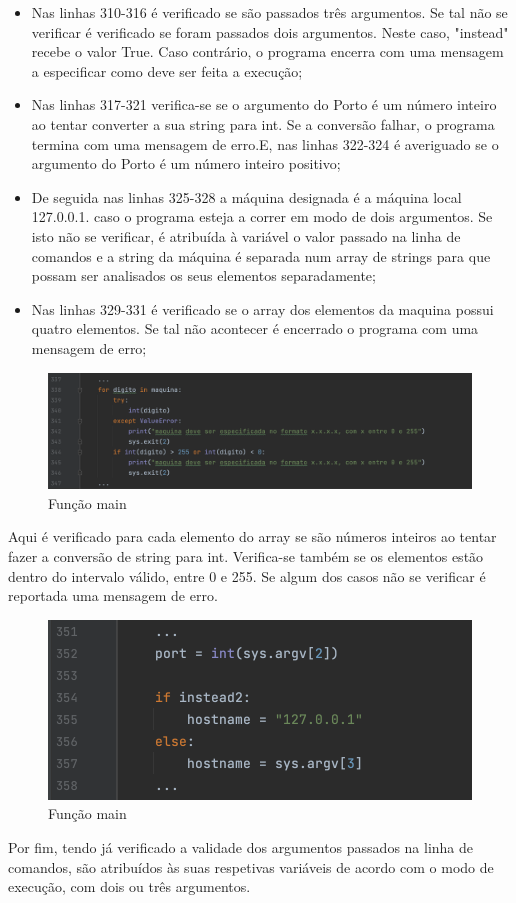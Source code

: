 \documentclass{report}
\begin{document}
\begin{itemize}
\item Nas linhas 310-316 é verificado se são passados três argumentos. Se tal não se verificar é verificado se foram passados dois argumentos. Neste caso, "instead" recebe o valor True. Caso contrário, o programa encerra com uma mensagem a especificar como deve ser feita a execução;
\item Nas linhas 317-321 verifica-se se o argumento do Porto é um número inteiro ao tentar converter a sua string para int. Se a conversão falhar, o programa termina com uma mensagem de erro.E, nas linhas 322-324 é averiguado se o argumento do Porto é um número inteiro positivo;
\item De seguida nas linhas 325-328 a máquina designada é a máquina local 127.0.0.1. caso o programa esteja a correr em modo de dois argumentos. Se isto não se verificar, é atribuída à variável o valor passado na linha de comandos e a string da máquina é separada num array de strings para que possam ser analisados os seus elementos separadamente;
\item Nas linhas 329-331 é verificado se o array dos elementos da maquina possui quatro elementos. Se tal não acontecer é encerrado o programa com uma mensagem de erro;
\end{itemize}

\begin{figure}[H]
        \centering
        \includegraphics[scale=0.40]{main2}      
        \caption{Função main}
\end{figure}
Aqui é verificado para cada elemento do array se são números inteiros ao tentar fazer a conversão de string para int. Verifica-se também se os elementos estão dentro do intervalo válido, entre 0 e 255. Se algum dos casos não se verificar é reportada uma mensagem de erro.

\begin{figure}[H]
        \centering
        \includegraphics[scale=0.40]{main3}      
        \caption{Função main}
\end{figure}
Por fim, tendo já verificado a validade dos argumentos passados na linha de comandos, são atribuídos às suas respetivas variáveis de acordo com o modo de execução, com dois ou três argumentos.
\end{document}

